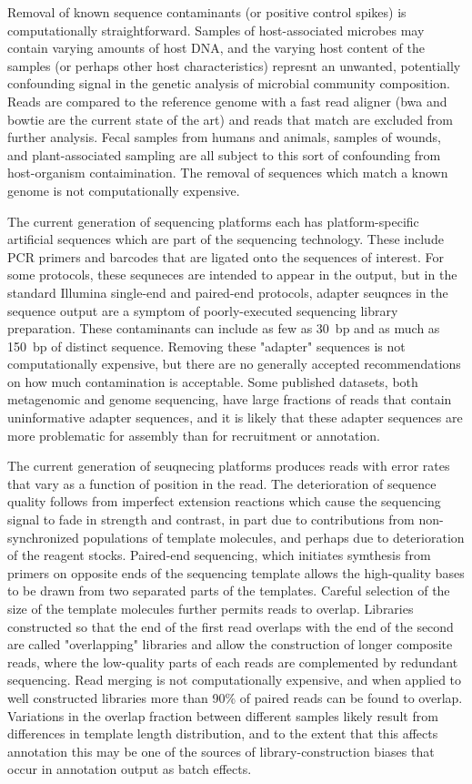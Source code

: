 \documentclass[graybox]{svmult}
\begin{document}
        Removal of known sequence contaminants (or positive control spikes) is computationally straightforward.   Samples of host-associated microbes may contain varying amounts of host DNA, and the varying host content of the samples (or perhaps other host characteristics) represnt an unwanted, potentially confounding signal in the genetic analysis of microbial community composition.  Reads are compared to the reference genome with a fast read aligner (bwa and bowtie are the current state of the art) and reads that match are excluded from further analysis.   Fecal samples from humans and animals, samples of wounds, and plant-associated sampling are all subject to this sort of confounding from host-organism contaimination.  The removal of sequences which match a known genome is not computationally expensive.

        The current generation of sequencing platforms each has platform-specific artificial sequences which are part of the sequencing technology.  These include PCR primers and barcodes that are ligated onto the sequences of interest.
For some protocols, these sequneces are intended to appear in the output, but in the standard Illumina single-end and paired-end protocols, adapter seuqnces in the sequence output are a symptom of poorly-executed sequencing library preparation.
These contaminants can include as few as 30~bp and as much as 150~bp of distinct sequence.   Removing these "adapter" sequences is not computationally expensive, but there are no generally accepted recommendations on how much contamination is acceptable.
Some published datasets, both metagenomic and genome sequencing, have large fractions of reads that contain uninformative adapter sequences, and it is likely that these adapter sequences are more problematic for assembly than for recruitment or annotation.

        The current generation of seuqnecing platforms produces reads with error rates that vary as a function of position in the read.  The deterioration of sequence quality follows from imperfect extension reactions which cause the sequencing signal to fade in strength and contrast, in part due to contributions from non-synchronized populations of template molecules, and perhaps due to deterioration of the reagent stocks.   Paired-end sequencing, which initiates symthesis from primers on opposite ends of the sequencing template allows the high-quality bases to be drawn from two separated parts of the templates.  Careful selection of the size of the template molecules further permits reads to overlap.  Libraries constructed so that the end of the first read overlaps with the end of the second are called "overlapping" libraries and allow the construction of longer composite reads, where the low-quality parts of each reads are complemented by redundant sequencing.  Read merging is not computationally expensive, and when applied to well constructed libraries more than 90\% of paired reads can be found to overlap.  Variations in the overlap fraction between different samples likely result from differences in template length distribution, and to the extent that this affects annotation this may be one of the sources of library-construction biases that occur in annotation output as batch effects.
\end{document}
